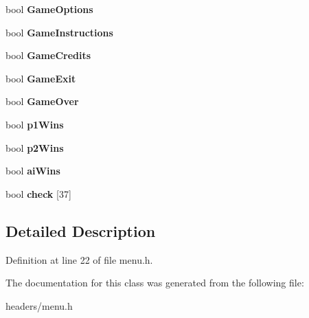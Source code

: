 \begin{DoxyCompactItemize}
\item 
\hypertarget{classMenu_a1799b04d4f77817f10cff13106e18485}{bool {\bfseries Game\+Options}}\label{classMenu_a1799b04d4f77817f10cff13106e18485}

\item 
\hypertarget{classMenu_ad6cbdc2092ed8fd87d74bf90d3f1a3e7}{bool {\bfseries Game\+Instructions}}\label{classMenu_ad6cbdc2092ed8fd87d74bf90d3f1a3e7}

\item 
\hypertarget{classMenu_a578878b8740857c76d670599c7e2ce71}{bool {\bfseries Game\+Credits}}\label{classMenu_a578878b8740857c76d670599c7e2ce71}

\item 
\hypertarget{classMenu_ab8d07f1469e43b6601999a2c616101e6}{bool {\bfseries Game\+Exit}}\label{classMenu_ab8d07f1469e43b6601999a2c616101e6}

\item 
\hypertarget{classMenu_a584b4bdd07538a175037e9180fa06488}{bool {\bfseries Game\+Over}}\label{classMenu_a584b4bdd07538a175037e9180fa06488}

\item 
\hypertarget{classMenu_a9eaa32f09cd27bf9e837290f56e70496}{bool {\bfseries p1\+Wins}}\label{classMenu_a9eaa32f09cd27bf9e837290f56e70496}

\item 
\hypertarget{classMenu_a32a7e7f7220b20bb97b200cf1d08560a}{bool {\bfseries p2\+Wins}}\label{classMenu_a32a7e7f7220b20bb97b200cf1d08560a}

\item 
\hypertarget{classMenu_a6b06718449e7b082fa387c6b5d218fb5}{bool {\bfseries ai\+Wins}}\label{classMenu_a6b06718449e7b082fa387c6b5d218fb5}

\item 
\hypertarget{classMenu_a2e10f19cfd062c94eb26b8710ac424c6}{bool {\bfseries check} \mbox{[}37\mbox{]}}\label{classMenu_a2e10f19cfd062c94eb26b8710ac424c6}

\end{DoxyCompactItemize}


\subsection{Detailed Description}


Definition at line 22 of file menu.\+h.



The documentation for this class was generated from the following file\+:\begin{DoxyCompactItemize}
\item 
headers/menu.\+h\end{DoxyCompactItemize}
